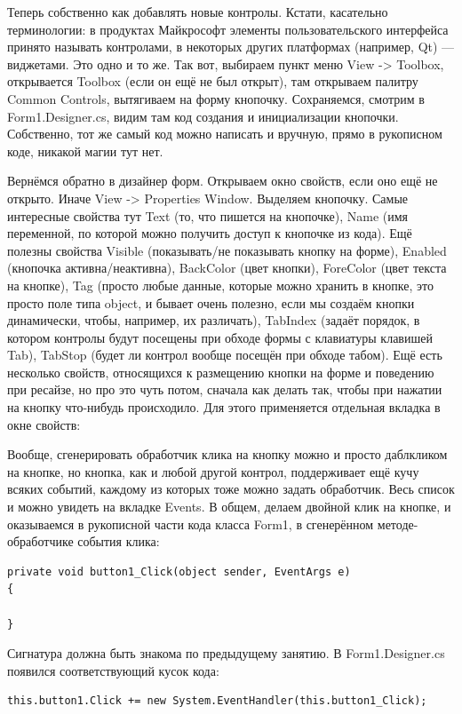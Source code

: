 \documentclass[a5paper]{article}
\begin{document}
Теперь собственно как добавлять новые контролы. Кстати, касательно терминологии: в продуктах Майкрософт элементы пользовательского интерфейса принято называть контролами, в некоторых других платформах (например, Qt) --- виджетами. Это одно и то же. Так вот, выбираем пункт меню View -> Toolbox, открывается Toolbox (если он ещё не был открыт), там открываем палитру Common Controls, вытягиваем на форму кнопочку. Сохраняемся, смотрим в Form1.Designer.cs, видим там код создания и инициализации кнопочки. Собственно, тот же самый код можно написать и вручную, прямо в рукописном коде, никакой магии тут нет. 

Вернёмся обратно в дизайнер форм. Открываем окно свойств, если оно ещё не открыто. Иначе View -> Properties Window. Выделяем кнопочку. Самые интересные свойства тут Text (то, что пишется на кнопочке), Name (имя переменной, по которой можно получить доступ к кнопочке из кода). Ещё полезны свойства Visible (показывать/не показывать кнопку на форме), Enabled (кнопочка активна/неактивна), BackColor (цвет кнопки), ForeColor (цвет текста на кнопке), Tag (просто любые данные, которые можно хранить в кнопке, это просто поле типа object, и бывает очень полезно, если мы создаём кнопки динамически, чтобы, например, их различать), TabIndex (задаёт порядок, в котором контролы будут посещены при обходе формы с клавиатуры клавишей Tab), TabStop (будет ли контрол вообще посещён при обходе табом). Ещё есть несколько свойств, относящихся к размещению кнопки на форме и поведению при ресайзе, но про это чуть потом, сначала как делать так, чтобы при нажатии на кнопку что-нибудь происходило.
Для этого применяется отдельная вкладка в окне свойств:

Вообще, сгенерировать обработчик клика на кнопку можно и просто даблкликом на кнопке, но кнопка, как и любой другой контрол, поддерживает ещё кучу всяких событий, каждому из которых тоже можно задать обработчик. Весь список и можно увидеть на вкладке Events. В общем, делаем двойной клик на кнопке, и оказываемся в рукописной части кода класса Form1, в сгенерённом методе-обработчике события клика:

\begin{verbatim}
private void button1_Click(object sender, EventArgs e)
{

}
\end{verbatim}

Сигнатура должна быть знакома по предыдущему занятию. В Form1.Designer.cs появился соответствующий кусок кода:
\begin{verbatim}
this.button1.Click += new System.EventHandler(this.button1_Click);
\end{verbatim}
\end{document}
